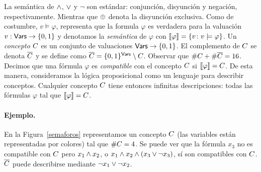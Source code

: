 
La semántica de $\wedge$, $\vee$ y $\lnot$ son estándar: conjunción, disyunción y negación, respectivamente. Mientras que $\oplus$ denota la disyunción exclusiva. Como de costumbre, $v\models \varphi$, representa que la formula $\varphi$ es verdadera para la valuación $v:{\sf Vars}\to\{0,1\}$ y denotamos la {\em semántica} de $\varphi$ con $\llbracket \varphi\rrbracket=\{v\colon v\models\varphi\}$. Un {\em concepto} $C$ es un conjunto de valuaciones ${\sf Vars}\to\{0,1\}$. El complemento de $C$ se denota $\overline {C}$ y se define como $\overline {C}=\{0,1\}^{\sf Vars}\setminus C$. Observar que $\#C+\#\overline {C}=16$. Decimos que una fórmula $\varphi$ es {\em compatible} con el concepto $C$ si $\llbracket \varphi\rrbracket=C$. De esta manera, consideramos la lógica proposicional como un lenguaje para describir conceptos. Cualquier concepto $C$ tiene entonces infinitas descripciones: todas las fórmulas $\varphi$ tal que $\llbracket \varphi\rrbracket=C$. 

\paragraph*{Ejemplo.}
En la Figura~\ref{semaforos} representamos un concepto $C$ (las variables están representadas por colores) tal que $\#C=4$. Se puede ver que la fórmula $x_3$ no es compatible con $C$ pero $x_1 \wedge x_2$, o $x_1 \wedge x_2 \wedge (x_3 \vee \lnot x_3)$, sí son compatibles con $C$. $\overline {C}$ puede describirse mediante $\lnot x_1\vee \lnot x_2$.

